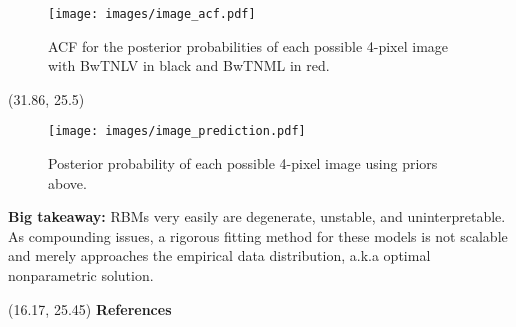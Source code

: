 \documentclass[extrafontsizes, 30pt]{memoir}
\begin{document}
\begin{textblock}{14}
\begin{figure}
\centering
\texttt{[image: images/image\_acf.pdf]}
\label{fig:image_pred}
\vspace*{-15mm}
\caption{ACF for the posterior probabilities of each possible 4-pixel image with BwTNLV in black and BwTNML in red.}
\end{figure}

\end{textblock}

\begin{textblock}{14.54}(31.86, 25.5)
\begin{figure}
\centering
\texttt{[image: images/image\_prediction.pdf]}
\label{fig:image_pred}
\vspace*{-15mm}
\caption{Posterior probability of each possible 4-pixel image using priors above.}
\end{figure}

{\bfseries Big takeaway:} RBMs very easily are degenerate, unstable, and uninterpretable. As compounding issues, a rigorous fitting method for these models is not scalable and merely approaches the empirical data distribution, a.k.a optimal nonparametric solution.
\end{textblock}







\begin{textblock}{14.5}(16.17, 25.45)
{\large \bfseries References}
\printbibliography[heading=none]

\end{textblock}
\end{document}
